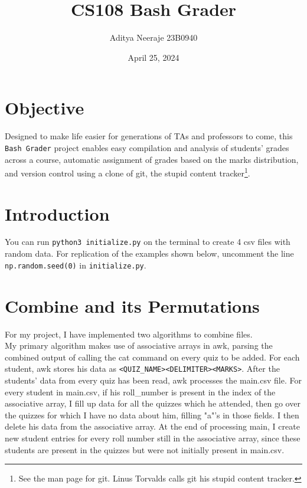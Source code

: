 \documentclass{article}
\title{CS108 Bash Grader}
\author{Aditya Neeraje \raisebox{0.5ex}{\texttildelow} 23B0940}
\date{April 25, 2024}
\begin{document}
    \maketitle
    \pagebreak
    \tableofcontents
    \section{Objective}
    Designed to make life easier for generations of TAs and professors to come, this \texttt{Bash Grader} project enables easy compilation and analysis of students' grades across a course, automatic assignment of grades based on the marks distribution, and version control using a clone of git, the stupid content tracker\footnote{See the man page for git. Linus Torvalds calls git his stupid content tracker.}.

    \section{Introduction}
    You can run \texttt{python3 initialize.py} on the terminal to create 4 csv files with random data. For replication of the examples shown below, uncomment the line \texttt{np.random.seed(0)} in \texttt{initialize.py}.
    
    \section{Combine and its Permutations}
    For my project, I have implemented two algorithms to combine files.
    \\
    My primary algorithm makes use of associative arrays in awk, parsing the combined output of calling the cat command on every quiz to be added.
    For each student, awk stores his data as \texttt{\textless QUIZ\_NAME\textgreater \textless DELIMITER\textgreater\textless MARKS\textgreater}. After the students' data from every quiz has been read, 
    awk processes the main.csv file. For every student in main.csv, if his roll\_number is present in the index of the associative array, I fill up data for all the quizzes which he attended, then go over the quizzes for which I have no data about him, filling "a"'s in those fields. I then delete his data from the associative array. At the end of processing main, I create new student entries for every roll number still in the associative array, since these students are present in the quizzes but were not initially present in main.csv. 
\end{document}
